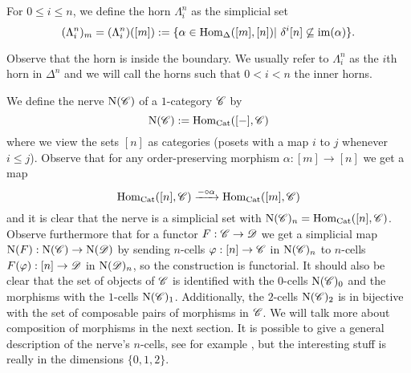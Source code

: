 \documentclass[../../thesis.tex]{subfiles}
\begin{document}
\begin{definition}
    For $0\leq i \leq n$, we define the horn $\Lambda_i^n$ as the simplicial set
    \[
        (\Lambda_i^n)_m =(\Lambda_i^n)([m]) :=\{\alpha \in \Hom_{\Delta}([m], [n]) | \delta^i[n] \not\subseteq \mathrm{im}(\alpha)\}.
    \]
\end{definition}
Observe that the horn is inside the boundary.
We usually refer to $\Lambda_i^n$ as the $i$th horn in $\Delta^n$ and we will call the horns such that $0<i<n$ the inner horns.
\begin{example}
\end{example}
\begin{example}\label{NerveDef}
    We define the nerve $\mathrm{N}(\mathscr{C})$ of a $1$-category $\mathscr{C}$ by
    \[
        \mathrm{N}(\mathscr{C}) : = \mathrm{Hom}_{\mathrm{Cat}}([{-}], \mathscr{C})
    \]
    where we view the sets $[n]$ as categories (posets with a map $i$ to $j$ whenever $i\leq j$).
    Observe that for any order-preserving morphism $\alpha : [m] \to [n]$ we get a map
    \[
        \mathrm{Hom}_{\mathrm{Cat}}([n], \mathscr{C}) \xrightarrow{{-} \circ \alpha} \mathrm{Hom}_{\mathrm{Cat}}([m], \mathscr{C})
    \]
    and it is clear that the nerve is a simplicial set with $\mathrm{N}(\mathscr{C})_n = \mathrm{Hom}_{\mathrm{Cat}}([n], \mathscr{C})$.
    \newline
    Observe furthermore that for a functor $F: \mathscr{C} \to \mathscr{D}$ we get a simplicial map $\mathrm{N}(F):\mathrm{N}(\mathscr{C}) \to \mathrm{N}(\mathscr{D})$ by sending $n$-cells $\varphi : [n] \to \mathscr{C}$ in $\mathrm{N}(\mathscr{C})_n$ to $n$-cells $F(\varphi) : [n] \to \mathscr{D}$ in $\mathrm{N}(\mathscr{D})_n$, so the construction is functorial.
    It should also be clear that the set of objects of $\mathscr{C}$ is identified with the $0$-cells $\mathrm{N}(\mathscr{C})_0$ and the morphisms with the $1$-cells $\mathrm{N}(\mathscr{C})_1$.
    Additionally, the $2$-cells $\mathrm{N}(\mathscr{C})_2$ is in bijective with the set of composable pairs of morphisms in $\mathscr{C}$.
    We will talk more about composition of morphisms in the next section.
    It is possible to give a general description of the nerve's $n$-cells, see for example \cite[Proposition 4.4.]{Rezk}, but the interesting stuff is really in the dimensions $\{0,1,2\}$.
\end{example}
\end{document}
